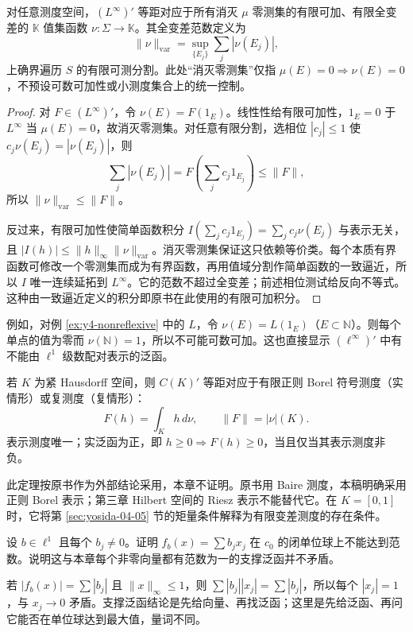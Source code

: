\begin{theorem}\label{thm:y4-Linfty-ba}
对任意测度空间，$(L^\infty)'$ 等距对应于所有消灭 $\mu$ 零测集的有限可加、有限全变差的 $\mathbb K$ 值集函数 $\nu:\Sigma\to\mathbb K$。其全变差范数定义为
\[
 \|\nu\|_{\mathrm{var}}=
 \sup_{\{E_j\}}\sum_j|\nu(E_j)|,
\]
上确界遍历 $S$ 的有限可测分割。此处“消灭零测集”仅指 $\mu(E)=0\Rightarrow\nu(E)=0$，不预设可数可加性或小测度集合上的统一控制。
\end{theorem}
\begin{proof}
对 $F\in(L^\infty)'$，令 $\nu(E)=F(1_E)$。线性性给有限可加性，$1_E=0$ 于 $L^\infty$ 当 $\mu(E)=0$，故消灭零测集。对任意有限分割，选相位 $|c_j|\le1$ 使 $c_j\nu(E_j)=|\nu(E_j)|$，则
\[
 \sum_j|\nu(E_j)|=F\left(\sum_jc_j1_{E_j}\right)\le\|F\|,
\]
所以 $\|\nu\|_{\mathrm{var}}\le\|F\|$。

反过来，有限可加性使简单函数积分 $I(\sum_jc_j1_{E_j})=\sum_jc_j\nu(E_j)$ 与表示无关，且
$|I(h)|\le\|h\|_\infty\|\nu\|_{\mathrm{var}}$。消灭零测集保证这只依赖等价类。每个本质有界函数可修改一个零测集而成为有界函数，再用值域分割作简单函数的一致逼近，所以 $I$ 唯一连续延拓到 $L^\infty$。它的范数不超过全变差；前述相位测试给反向不等式。这种由一致逼近定义的积分即原书在此使用的有限可加积分。
\end{proof}

例如，对例 \ref{ex:y4-nonreflexive} 中的 $L$，令 $\nu(E)=L(1_E)$（$E\subset\mathbb N$）。则每个单点的值为零而 $\nu(\mathbb N)=1$，所以不可能可数可加。这也直接显示 $(\ell^\infty)'$ 中有不能由 $\ell^1$ 级数配对表示的泛函。

\begin{theorem}\label{thm:y4-riesz-markov}
若 $K$ 为紧 Hausdorff 空间，则 $C(K)'$ 等距对应于有限正则 Borel 符号测度（实情形）或复测度（复情形）：
\[
 F(h)=\int_Kh\,d\nu,\qquad \|F\|=|\nu|(K).
\]
表示测度唯一；实泛函为正，即 $h\ge0\Rightarrow F(h)\ge0$，当且仅当其表示测度非负。
\end{theorem}

此定理按原书作为外部结论采用，本章不证明。原书用 Baire 测度，本稿明确采用正则 Borel 表示；第三章 Hilbert 空间的 Riesz 表示不能替代它。在 $K=[0,1]$ 时，它将第 \ref{sec:yosida-04-05} 节的矩量条件解释为有限变差测度的存在条件。

\begin{exercise}
设 $b\in\ell^1$ 且每个 $b_j\ne0$。证明 $f_b(x)=\sum b_jx_j$ 在 $c_0$ 的闭单位球上不能达到范数。说明这与本章每个非零向量都有范数为一的支撑泛函并不矛盾。
\end{exercise}
\begin{solution}
若 $|f_b(x)|=\sum|b_j|$ 且 $\|x\|_\infty\le1$，则
$\sum|b_j||x_j|=\sum|b_j|$，所以每个 $|x_j|=1$，与 $x_j\to0$ 矛盾。支撑泛函结论是先给向量、再找泛函；这里是先给泛函、再问它能否在单位球达到最大值，量词不同。
\end{solution}

